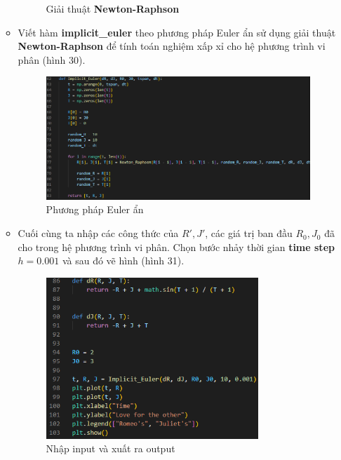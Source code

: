 \begin{enumerate}
\begin{itemize}
\begin{figure}[h!]
\begin{center}
            \end{center}
            \caption{Giải thuật \textbf{Newton-Raphson}}
        \end{figure}
        \item Viết hàm \textbf{implicit\_euler} theo phương pháp Euler ẩn sử dụng giải thuật \textbf{Newton-Raphson} để tính toán nghiệm xấp xỉ cho hệ phương trình vi phân (hình 30).
         \begin{figure}[h!]
            \begin{center}
            \includegraphics[width=14cm]{images/implicit_euler.png}
            \end{center}
            \caption{Phương pháp Euler ẩn}
        \end{figure}
        \item Cuối cùng ta nhập các công thức của $R', J'$, các giá trị ban đầu $R_0, J_0$ đã cho trong hệ phương trình vi phân. Chọn bước nhảy thời gian \textbf{time step} $h = 0.001$ và sau đó vẽ hình (hình 31).
        \begin{figure}[h!]
            \begin{center}
            \includegraphics[width=8cm]{images/euler_plot.png}
            \end{center}
            \caption{Nhập input và xuất ra output}
        \end{figure}

\end{itemize}
\end{enumerate}
